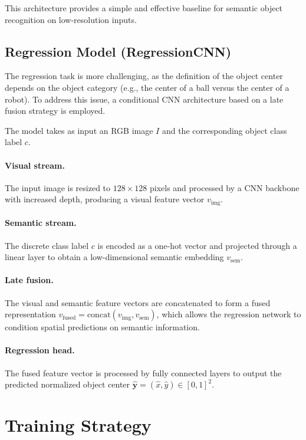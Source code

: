\documentclass[a4paper,11pt]{article}
\begin{document}
This architecture provides a simple and effective baseline for semantic object recognition on low-resolution inputs.

\subsection{Regression Model (RegressionCNN)}

The regression task is more challenging, as the definition of the object center
depends on the object category (e.g., the center of a ball versus the center of a
robot). To address this issue, a conditional CNN architecture based on a late
fusion strategy is employed.

The model takes as input an RGB image $I$ and the corresponding object class
label $c$.

\paragraph{Visual stream.}
The input image is resized to $128 \times 128$ pixels and processed by a CNN
backbone with increased depth, producing a visual feature vector
$v_{\text{img}}$.

\paragraph{Semantic stream.}
The discrete class label $c$ is encoded as a one-hot vector and projected through
a linear layer to obtain a low-dimensional semantic embedding
$v_{\text{sem}}$.

\paragraph{Late fusion.}
The visual and semantic feature vectors are concatenated to form a fused
representation
$v_{\text{fused}} = \mathrm{concat}(v_{\text{img}}, v_{\text{sem}})$,
which allows the regression network to condition spatial predictions on semantic
information.

\paragraph{Regression head.}
The fused feature vector is processed by fully connected layers to output the
predicted normalized object center
$\hat{\mathbf{y}} = (\hat{x}, \hat{y}) \in [0,1]^2$.

\section{Training Strategy}
\end{document}
